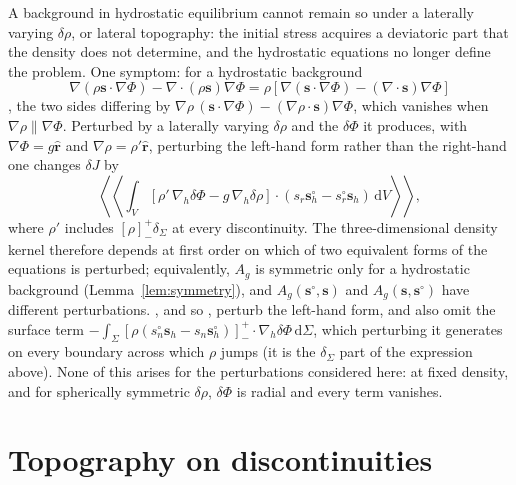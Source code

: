 \documentclass[11pt,a4paper]{article}
\newcommand{\bs}{\mathbf{s}}
\newcommand{\br}{\hat{\mathbf{r}}}
\newcommand{\sd}{\mathbf{s}^\circ}
\newcommand{\jump}[1]{\left[#1\right]^+_-}
\newcommand{\dd}{\,\mathrm{d}}
\theoremstyle{remark}
\begin{document}
A background in hydrostatic equilibrium cannot remain so under a laterally
varying $\delta\rho$, or lateral topography: the initial stress acquires a
deviatoric part that the density does not determine, and the hydrostatic
equations no longer define the problem. One symptom: for a hydrostatic
background
\begin{equation}
  \nabla(\rho\bs\cdot\nabla\Phi) - \nabla\cdot(\rho\bs)\nabla\Phi =
  \rho\left[\nabla(\bs\cdot\nabla\Phi) - (\nabla\cdot\bs)\nabla\Phi\right]
\end{equation}
\citep[][eq.~B23]{AlAttarTromp2014}, the two sides differing by
$\nabla\rho\,(\bs\cdot\nabla\Phi) - (\nabla\rho\cdot\bs)\nabla\Phi$, which
vanishes when $\nabla\rho\parallel\nabla\Phi$. Perturbed by a laterally
varying $\delta\rho$ and the $\delta\Phi$ it produces, with $\nabla\Phi=g\br$
and $\nabla\rho = \rho'\br$, perturbing the left-hand form rather than the
right-hand one changes $\delta J$ by
\begin{equation}
  \left\langle\!\!\left\langle\int_V\left[\rho'\,\nabla_h\delta\Phi -
  g\,\nabla_h\delta\rho\right]\cdot\left(s_r\sd_h - s^\circ_r\bs_h\right)
  \dd V\right\rangle\!\!\right\rangle,
\end{equation}
where $\rho'$ includes $\jump{\rho}\delta_\Sigma$ at every discontinuity.
The three-dimensional density kernel therefore depends at first order on
which of two equivalent forms of the equations is perturbed; equivalently,
$A_g$ is symmetric only for a hydrostatic background
(Lemma~\ref{lem:symmetry}), and $A_g(\sd,\bs)$ and $A_g(\bs,\sd)$ have
different perturbations. \citet{LiuTromp2008}, and so \citet{Eaton2026},
perturb the left-hand form, and also omit the surface term
$-\int_\Sigma\jump{\rho(s^\circ_n\bs_h - s_n\sd_h)}\cdot\nabla_h\delta\Phi
\dd\Sigma$, which perturbing it generates on every boundary across which
$\rho$ jumps (it is the $\delta_\Sigma$ part of the expression above). None
of this arises for the perturbations considered here: at fixed density, and
for spherically symmetric $\delta\rho$, $\delta\Phi$ is radial and every term
vanishes.

\section{Topography on discontinuities}\label{sec:boundaries}
\end{document}
